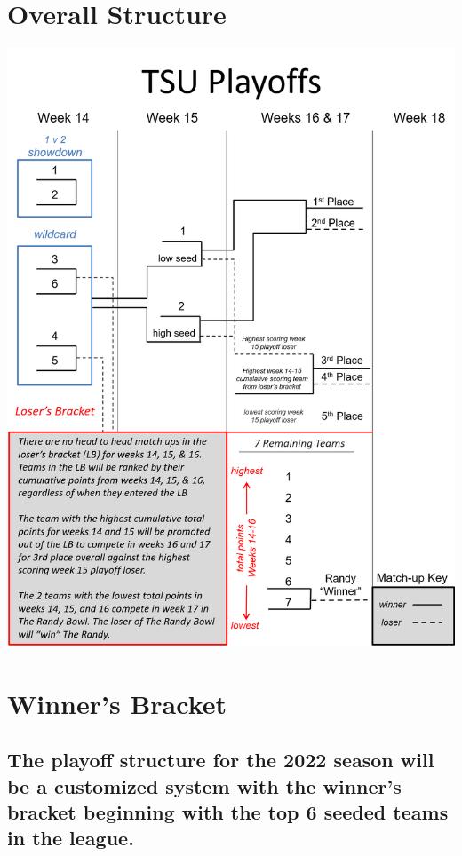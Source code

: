 \documentclass[
]{book}
\begin{document}
\hypertarget{overall-structure}{%
\section{Overall Structure}\label{overall-structure}}

\includegraphics[width=0.9\linewidth]{images/tsu-playoffs}

\hypertarget{winners-bracket}{%
\section{Winner's Bracket}\label{winners-bracket}}

\hypertarget{the-playoff-structure-for-the-2022-season-will-be-a-customized-system-with-the-winners-bracket-beginning-with-the-top-6-seeded-teams-in-the-league.}{%
\subsection{The playoff structure for the 2022 season will be a customized system with the winner's bracket beginning with the top 6 seeded teams in the league.}\label{the-playoff-structure-for-the-2022-season-will-be-a-customized-system-with-the-winners-bracket-beginning-with-the-top-6-seeded-teams-in-the-league.}}
\end{document}
